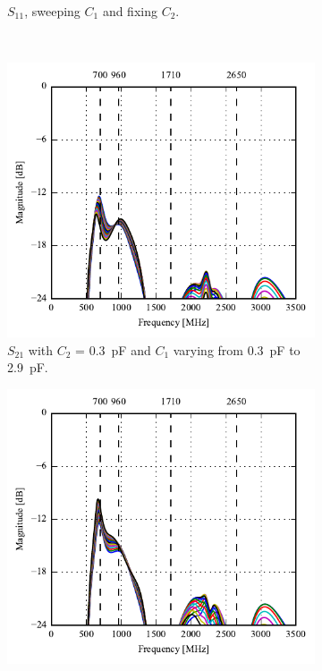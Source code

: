 \begin{figure}[htbp]
\begin{subfigure}[b]{0.49\linewidth}
        \caption{$S_{11}$, sweeping $C_1$ and fixing $C_2$.}
        \label{fig:ant1_s22}
    \end{subfigure}
~
    \begin{subfigure}[b]{0.49\linewidth}
        \centering
        \includegraphics{img/tech_sol/monopole/talk_mode/s21_s11}
        \caption{$S_{21}$ with $C_2$ = \SI{0.3}{pF} and $C_1$ varying from \SI{0.3}{pF} to \SI{2.9}{pF}.}
        \label{fig:ant1_s11}
    \end{subfigure}
    \hfill
    \begin{subfigure}[b]{0.49\linewidth}
        \centering
        \includegraphics{img/tech_sol/monopole/talk_mode/s21_s22}

\end{subfigure}
\end{figure}
